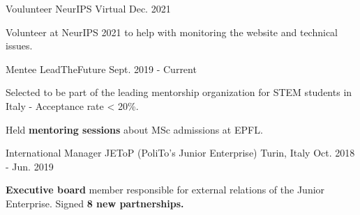 

\begin{cventries}

\cventry
{Voulunteer} %
{NeurIPS} %
{Virtual} %
{Dec. 2021} %
{
    \begin{cvitems} %
        \item{Volunteer at NeurIPS 2021 to help with monitoring the website and technical issues.}
    \end{cvitems}
}

\cventry
{Mentee} %
{LeadTheFuture} %
{} %
{Sept. 2019 - Current} %
{
    \begin{cvitems} %
        \item{Selected to be part of the leading mentorship organization for STEM students in Italy - Acceptance rate < 20\%.}
        \item{Held \textbf{mentoring sessions} about MSc admissions at EPFL.}
    \end{cvitems}
}

\cventry
{International Manager} %
{JEToP (PoliTo's Junior Enterprise)} %
{Turin, Italy} %
{Oct. 2018 - Jun. 2019} %
{
    \begin{cvitems} %
        \item{\textbf{Executive board} member responsible for external relations of the Junior Enterprise. Signed \textbf{8 new partnerships.}}
    \end{cvitems}
}
\end{cventries}
